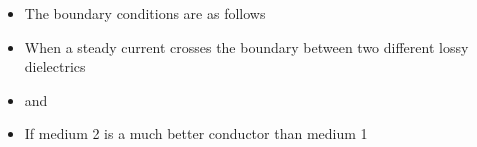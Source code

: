 \begin{ELjoin}

\begin{itemize}
\tightlist
\item
  The boundary conditions are as follows
\end{itemize}

\begin{ELimportant}{}


\end{ELimportant}

\end{ELjoin}

\begin{ELunit}

\begin{itemize}
\tightlist
\item
  When a steady current crosses the boundary between two different lossy dielectrics
\end{itemize}


\begin{itemize}
\tightlist
\item
   and 
\item
  If medium 2 is a much better conductor than medium 1
\end{itemize}


\end{ELunit}

